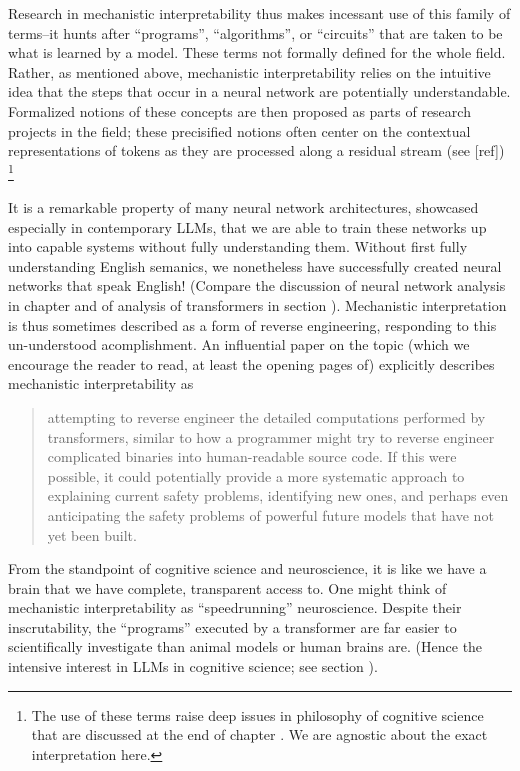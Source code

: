 Research in mechanistic interpretability thus makes incessant use of this
family of terms--it hunts after ``programs'', ``algorithms'', or ``circuits''
that are taken to be what is learned by a model. These terms not formally
defined for the whole field. Rather, as mentioned above, mechanistic
interpretability relies on the intuitive idea that the steps that occur in a
neural network are potentially understandable. Formalized notions of these
concepts are then proposed as parts of research projects in the field; these
precisified notions often center on the contextual representations of tokens as
they are processed along a residual stream (see [ref]) \footnote{The use of
these terms raise deep issues in philosophy of cognitive science that are
discussed at the end of chapter .  We are agnostic
about the exact interpretation here.}

It is a remarkable property of many neural network architectures, showcased
especially in contemporary LLMs, that we are able to train these networks up
into capable systems without fully understanding them. Without first fully
understanding English semanics, we nonetheless have successfully created neural
networks that speak English! (Compare the discussion of neural network analysis
in chapter  and of analysis of transformers in section
). Mechanistic interpretation is thus sometimes described as
a form of reverse engineering, responding to this un-understood acomplishment.
An influential paper on the topic (which we encourage the reader to read, at
least the opening pages of) explicitly describes mechanistic interpretability
as

\begin{quote}
attempting to reverse engineer the detailed computations performed by
transformers, similar to how a programmer might try to reverse engineer
complicated binaries into human-readable source code.  If this were possible,
it could potentially provide a more systematic approach to explaining current
safety problems, identifying new ones, and perhaps even anticipating the safety
problems of powerful future models that have not yet been
built.\cite{elhage2021mathematical} 
\end{quote}

From the standpoint of cognitive science and neuroscience, it is like we have a
brain that we have complete, transparent access to. One might think of
mechanistic interpretability as ``speedrunning'' neuroscience. Despite their
inscrutability, the ``programs'' executed by a transformer are far easier to
scientifically investigate than animal models or human brains are. (Hence the
intensive interest in LLMs in cognitive science; see section
).

